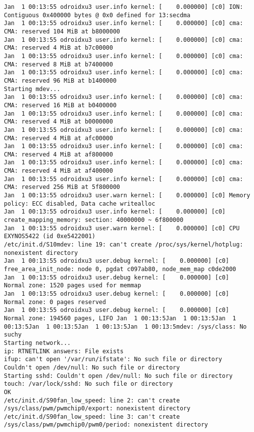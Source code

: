 \begin{lstlisting}[label={lst:switch root},caption=Changement de root file system]
Jan  1 00:13:55 odroidxu3 user.info kernel: [    0.000000] [c0] ION: Contiguous 0x400000 bytes @ 0x0 defined for 13:secdma
Jan  1 00:13:55 odroidxu3 user.info kernel: [    0.000000] [c0] cma: CMA: reserved 104 MiB at b8000000
Jan  1 00:13:55 odroidxu3 user.info kernel: [    0.000000] [c0] cma: CMA: reserved 4 MiB at b7c00000
Jan  1 00:13:55 odroidxu3 user.info kernel: [    0.000000] [c0] cma: CMA: reserved 8 MiB at b7400000
Jan  1 00:13:55 odroidxu3 user.info kernel: [    0.000000] [c0] cma: CMA: reserved 96 MiB at b1400000
Starting mdev...
Jan  1 00:13:55 odroidxu3 user.info kernel: [    0.000000] [c0] cma: CMA: reserved 16 MiB at b0400000
Jan  1 00:13:55 odroidxu3 user.info kernel: [    0.000000] [c0] cma: CMA: reserved 4 MiB at b0000000
Jan  1 00:13:55 odroidxu3 user.info kernel: [    0.000000] [c0] cma: CMA: reserved 4 MiB at afc00000
Jan  1 00:13:55 odroidxu3 user.info kernel: [    0.000000] [c0] cma: CMA: reserved 4 MiB at af800000
Jan  1 00:13:55 odroidxu3 user.info kernel: [    0.000000] [c0] cma: CMA: reserved 4 MiB at af400000
Jan  1 00:13:55 odroidxu3 user.info kernel: [    0.000000] [c0] cma: CMA: reserved 256 MiB at 5f800000
Jan  1 00:13:55 odroidxu3 user.warn kernel: [    0.000000] [c0] Memory policy: ECC disabled, Data cache writealloc
Jan  1 00:13:55 odroidxu3 user.info kernel: [    0.000000] [c0] create_mapping_memory: section: 40000000 ~ 6f800000
Jan  1 00:13:55 odroidxu3 user.warn kernel: [    0.000000] [c0] CPU EXYNOS5422 (id 0xe5422001)
/etc/init.d/S10mdev: line 19: can't create /proc/sys/kernel/hotplug: nonexistent directory
Jan  1 00:13:55 odroidxu3 user.debug kernel: [    0.000000] [c0] free_area_init_node: node 0, pgdat c097ab80, node_mem_map c0de2000
Jan  1 00:13:55 odroidxu3 user.debug kernel: [    0.000000] [c0]   Normal zone: 1520 pages used for memmap
Jan  1 00:13:55 odroidxu3 user.debug kernel: [    0.000000] [c0]   Normal zone: 0 pages reserved
Jan  1 00:13:55 odroidxu3 user.debug kernel: [    0.000000] [c0]   Normal zone: 194560 pages, LIFO Jan  1 00:13:5Jan  1 00:13:5Jan  1 00:13:5Jan  1 00:13:5Jan  1 00:13:5Jan  1 00:13:5mdev: /sys/class: No suchy
Starting network...
ip: RTNETLINK answers: File exists
ifup: can't open '/var/run/ifstate': No such file or directory
Couldn't open /dev/null: No such file or directory
Starting sshd: Couldn't open /dev/null: No such file or directory
touch: /var/lock/sshd: No such file or directory
OK
/etc/init.d/S90fan_low_speed: line 2: can't create /sys/class/pwm/pwmchip0/export: nonexistent directory
/etc/init.d/S90fan_low_speed: line 3: can't create /sys/class/pwm/pwmchip0/pwm0/period: nonexistent directory

\end{lstlisting}
